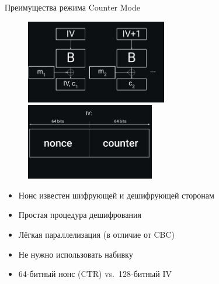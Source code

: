 \documentclass[usenames,dvipsnames,8pt,aspectratio=169]{beamer}
\begin{document}
\begin{frame}{Преимущества режима Counter Mode}
\begin{figure}
\includegraphics[width=0.55\textwidth]{CTR}
\includegraphics[width=0.5\textwidth]{ShapeOfIV}
\end{figure}
\vspace{-20pt}
\Large
\begin{itemize}
\item Нонс известен шифрующей и дешифрующей сторонам
\item Простая процедура дешифрования
\item Лёгкая параллелизация (в отличие от CBC)
\item Не нужно использовать набивку
\item 64-битный нонс (CTR) vs.\ 128-битный IV
\end{itemize}

\end{frame}
\end{document}
